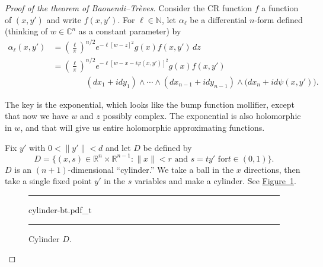 \documentclass[12pt,openany]{book}
\newcommand{\snorm}[1]{\lVert {#1} \rVert}
\newcommand{\C}{{\mathbb{C}}}
\newcommand{\R}{{\mathbb{R}}}
\newcommand{\N}{{\mathbb{N}}}
\theoremstyle{plain}
\theoremstyle{remark}
\theoremstyle{definition}
\newenvironment{myfig}{%
\begin{figure}[h!t]
\noindent\rule{\textwidth}{0.5pt}\vspace{12pt}\par\centering}%
{\par\noindent\rule{\textwidth}{0.5pt}
\end{figure}}
\theoremstyle{exercise}
\theoremstyle{example}
\newcommand{\figureref}[1]{\hyperref[#1]{Figure~\ref*{#1}}}
\begin{document}
\begin{proof}[Proof of the theorem of Baouendi--Tr{\`e}ves]
Consider the CR function $f$ a function of $(x,y')$
and write $f(x,y')$.
For $\ell \in \N$,
let $\alpha_{\ell}$ be a differential $n$-form defined (thinking
of $w \in \C^n$ as a constant parameter) by
\begin{equation*}
\begin{split}
\alpha_{\ell}(x,y')
& =
{\left(\frac{\ell}{\pi}\right)}^{n/2}
e^{-\ell [w - z]^2} g(x) f(x,y')
\,
dz
\\
& =
{\left(\frac{\ell}{\pi}\right)}^{n/2}
e^{-\ell [w - x-i\varphi(x,y')]^2} g(x) f(x,y')
\\
& \qquad \qquad
(dx_1 + idy_1)  \wedge
\cdots \wedge
(dx_{n-1} + i dy_{n-1})
\wedge
\bigl(dx_{n} + i d \psi (x,y') \bigr) .
\end{split}
\end{equation*}

The key is the exponential, which looks like the bump function
mollifier, except that now we have $w$ and $z$
possibly complex.  The exponential is also holomorphic in $w$, and that will
give us entire holomorphic approximating functions.

Fix $y'$ with $0 < \snorm{y'} < d$ and let $D$ be defined by
\begin{equation*}
D = \bigl\{ (x,s) \in \R^n \times \R^{n-1} : \snorm{x} < r \text{ and } s = t y' \text{ for
$t \in (0,1)$} \bigr\} .
\end{equation*}
$D$ is an $(n+1)$-dimensional ``cylinder.''  We take a ball in the
$x$ directions, then take a single fixed point $y'$ in the $s$ variables and make a
cylinder.  See \figureref{fig:cylinder-bt}.

\begin{myfig}
{cylinder-bt.pdf_t}
\caption{Cylinder $D$.\label{fig:cylinder-bt}}
\end{myfig}


\end{proof}
\end{document}
